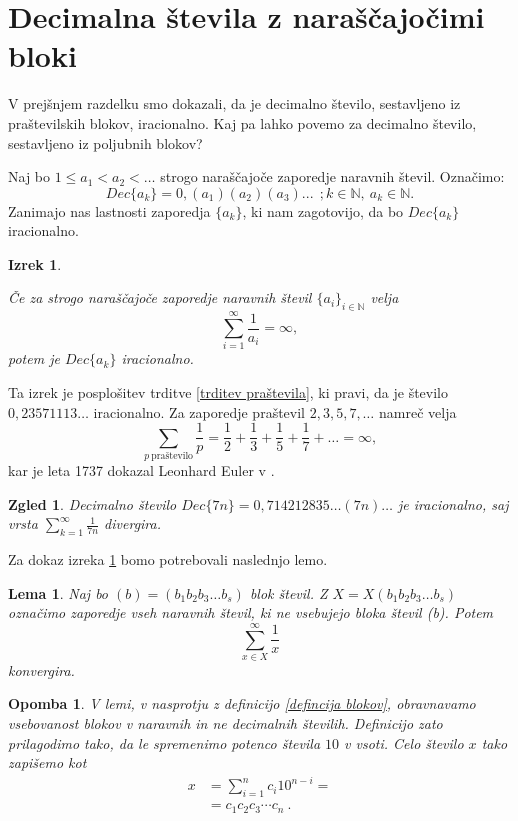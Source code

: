 \documentclass[a4paper,12pt]{article}
\def\N{\mathbb{N}} %
\newtheorem{izrek}{Izrek}
\newtheorem{lema}{Lema}
\newtheorem{opomba}{Opomba}
\newtheorem{zgled}{Zgled}
\begin{document}

\section{Decimalna števila z naraščajočimi bloki}

V prejšnjem razdelku smo dokazali, da je decimalno število, sestavljeno iz praštevilskih
blokov, iracionalno. Kaj pa lahko povemo za decimalno število, sestavljeno iz poljubnih blokov?

Naj bo $1 \leq a_1 < a_2 < \dots $ strogo naraščajoče zaporedje naravnih števil. 
Označimo: \[Dec\{a_k\} = 0,(a_1)(a_2)(a_3)... \  \ ; k \in \N, \ a_k \in \N . \]
Zanimajo nas lastnosti zaporedja $\{a_k\}$, ki nam zagotovijo, da bo $Dec\{a_k\}$ iracionalno.

\begin{izrek}\label{irac1}
    
    Če za strogo naraščajoče zaporedje naravnih števil $\{a_i\}_{i \in \N}$ velja 
    \[ \sum_{i=1}^{\infty} \frac{1}{a_i} = \infty ,\]
    potem je $Dec\{a_k\}$ iracionalno.
\end{izrek}

Ta izrek je posplošitev trditve \ref{trditev praštevila}, ki pravi, da je število $0,23571113 \dots$
iracionalno. Za zaporedje praštevil $2, 3, 5, 7, \dots$ namreč velja
\[
    \sum_{p \ \text{praštevilo}}\frac{1}{p} = \frac{1}{2} + \frac{1}{3} + \frac{1}{5} + \frac{1}{7} + \dots = \infty ,\]
kar je leta 1737 dokazal Leonhard Euler v \cite{Eul}.

\begin{zgled}
    Decimalno število $Dec\{7n\} = 0,714212835\dots (7n) \dots$ je iracionalno, saj
    vrsta $\sum_{k=1}^{\infty}\frac{1}{7n} $ divergira.
\end{zgled}

Za dokaz izreka \ref{irac1} bomo potrebovali naslednjo lemo.

\begin{lema}
    Naj bo $(b) = (b_1b_2b_3 \dots b_s)$ blok števil. Z $X = X(b_1b_2b_3 \dots b_s)$ označimo
    zaporedje vseh naravnih števil, ki ne vsebujejo bloka števil (b). Potem 
    \[ \sum_{x \in X}^{\infty} \frac{1}{x}\] konvergira.
\end{lema}

\begin{opomba}
    \label{lema bloki}
    V lemi, v nasprotju z definicijo \ref{defincija blokov}, obravnavamo vsebovanost blokov v naravnih
    in ne decimalnih številih. Definicijo zato prilagodimo tako, da le spremenimo potenco števila
    $10$ v vsoti. Celo število $x$ tako zapišemo kot 
    \[ 
        \begin{split}
            x & = \sum^n_{i=1} c_i 10^{n-i} = \\
            & = c_1c_2c_3 \cdots c_n \ .
        \end{split} \]
\end{opomba}
\end{document}
